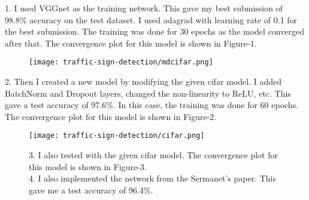 \documentclass[11pt]{article}
\begin{document}
1. I used VGGnet as the training network. This gave my best submission of 98.8\% accuracy on the test dataset. I used adagrad with learning rate of 0.1 for the best submission. The training was done for 30 epochs as the model converged after that. The convergence plot for this model is shown in Figure-1.\\
\begin{figure}[H]
\centering
\texttt{[image: traffic-sign-detection/mdcifar.png]}
\caption{ \label{fig2}}
\end{figure}

2. Then I created a new model by modifying the given cifar model. I added BatchNorm and Dropout layers, changed the non-linearity to ReLU, etc. This gave a test accuracy of 97.6\%. In this case, the training was done for 60 epochs. The convergence plot for this model is shown in Figure-2. \\
\begin{figure}[H]
\centering
\texttt{[image: traffic-sign-detection/cifar.png]}
\caption{ \label{fig2}}

3. I also tested with the given cifar model. The convergence plot for this model is shown in Figure-3. \\

4. I also implemented the network from the Sermanet's paper. This gave me a test accuracy of 96.4\%. \\
\end{figure}
\end{document}
